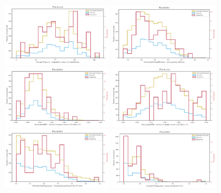 \documentclass[superscriptaddress,unsortedaddress,
 amsmath,amssymb,
 aps,
]{revtex4-2}
\begin{document}
\begin{figure}[h!]
    \centering
    \includegraphics[width=0.4\textwidth]{figures/histograms/new/ElementProperty_MagpieData range CovalentRadius_count_075.pdf}
    \includegraphics[width=0.4\textwidth]{figures/histograms/new/MaximumPackingEfficiency_max packing efficiency_count_075.pdf}
    \includegraphics[width=0.4\textwidth]{figures/histograms/new/GeneralizedRDF_std_dev Gaussian center=2.0 width=1.0_count_075.pdf}
    \includegraphics[width=0.4\textwidth]{figures/histograms/new/GeneralizedRDF_std_dev Gaussian center=3.0 width=1.0_count_075.pdf}
    \includegraphics[width=0.4\textwidth]{figures/histograms/new/ChemEnvSiteFingerprint_GaussianSymmFuncstd_dev G2_20.0_count_075.pdf}
    \includegraphics[width=0.4\textwidth]{figures/histograms/new/CrystalNNFingerprint_mean tetrahedral CN_4_count_075.pdf} 

\end{figure}
\end{document}
